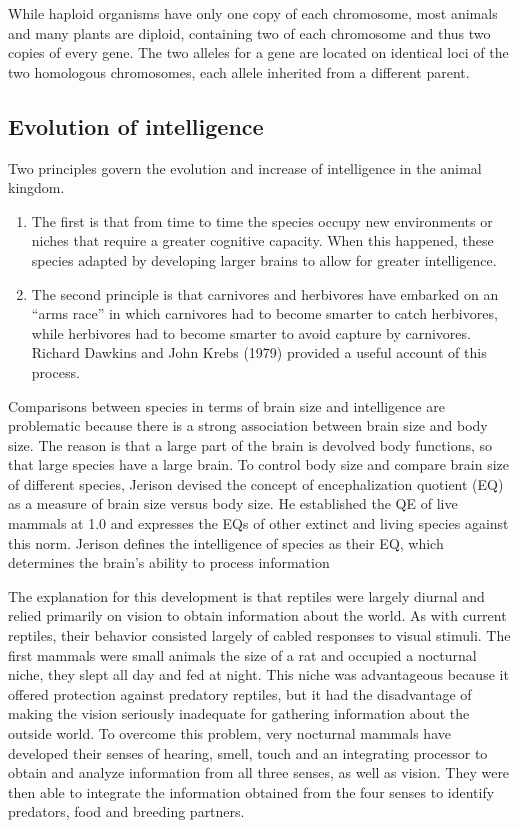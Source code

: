 While haploid organisms have only one copy of each chromosome, most animals and many plants are
diploid, containing two of each chromosome and thus two copies of every gene.
The two alleles for a gene are located on identical loci of the two homologous chromosomes,
each allele inherited from a different parent.

\subsection{Evolution of intelligence}
Two principles govern the evolution and increase of intelligence in the animal kingdom.
\begin{enumerate}
	\item The first is that from time to time the species occupy new environments or niches that
		require a greater cognitive capacity. When this happened, these species adapted by
		developing larger brains to allow for greater intelligence.
    \item The second principle is that carnivores and herbivores have embarked on an 
		``arms race'' in which carnivores had to become smarter to catch herbivores,
		while herbivores had to become smarter to avoid capture by carnivores.
		Richard Dawkins and John Krebs (1979) provided a useful account of this process.
\end{enumerate}

Comparisons between species in terms of brain size and intelligence are problematic because there
is a strong association between brain size and body size.
The reason is that a large part of the brain is devolved body functions, so that large species
have a large brain.
To control body size and compare brain size of different species, Jerison devised the concept 
of encephalization quotient (EQ) as a measure of brain size versus body size.
He established the QE of live mammals at 1.0 and expresses the EQs of other extinct and living
species against this norm. Jerison defines the intelligence of species as their EQ,
which determines the brain’s ability to process information

The explanation for this development is that reptiles were largely diurnal and relied primarily on
vision to obtain information about the world. 
As with current reptiles, their behavior consisted largely of cabled responses to visual stimuli.
The first mammals were small animals the size of a rat and occupied a nocturnal niche, they slept
all day and fed at night.
This niche was advantageous because it offered protection against predatory reptiles, but it had
the disadvantage of making the vision seriously inadequate for gathering information about the
outside world.
To overcome this problem, very nocturnal mammals have developed their senses of hearing, smell, 
touch and an integrating processor to obtain and analyze information from all three senses, as
well as vision.
They were then able to integrate the information obtained from the four senses to identify
predators, food and breeding partners.

